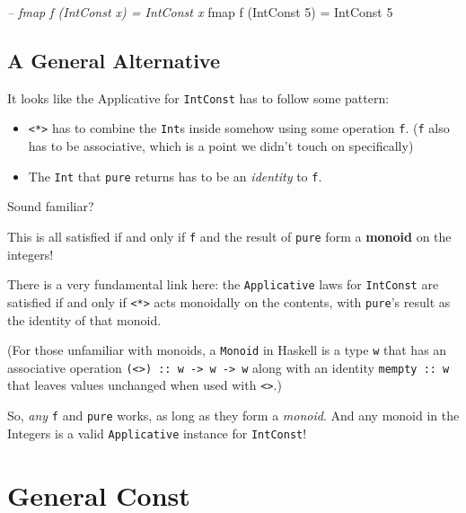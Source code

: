 \documentclass[]{article}
\newenvironment{Shaded}{}{}
\newcommand{\CommentTok}[1]{\textcolor[rgb]{0.38,0.63,0.69}{\textit{#1}}}
\newcommand{\DataTypeTok}[1]{\textcolor[rgb]{0.56,0.13,0.00}{#1}}
\newcommand{\DecValTok}[1]{\textcolor[rgb]{0.25,0.63,0.44}{#1}}
\newcommand{\FunctionTok}[1]{\textcolor[rgb]{0.02,0.16,0.49}{#1}}
\newcommand{\NormalTok}[1]{#1}
\begin{document}
\begin{Shaded}
\begin{Highlighting}[]
\CommentTok{-- fmap f (IntConst x) = IntConst x}
\NormalTok{fmap f (}\DataTypeTok{IntConst} \DecValTok{5}\NormalTok{) }\FunctionTok{=} \DataTypeTok{IntConst} \DecValTok{5}
\end{Highlighting}
\end{Shaded}

\hypertarget{a-general-alternative}{%
\subsection{A General Alternative}\label{a-general-alternative}}

It looks like the Applicative for \texttt{IntConst} has to follow some pattern:

\begin{itemize}
\tightlist
\item
  \texttt{\textless{}*\textgreater{}} has to combine the \texttt{Int}s inside
  somehow using some operation \texttt{f}. (\texttt{f} also has to be
  associative, which is a point we didn't touch on specifically)
\item
  The \texttt{Int} that \texttt{pure} returns has to be an \emph{identity} to
  \texttt{f}.
\end{itemize}

Sound familiar?

This is all satisfied if and only if \texttt{f} and the result of \texttt{pure}
form a \textbf{monoid} on the integers!

There is a very fundamental link here: the \texttt{Applicative} laws for
\texttt{IntConst} are satisfied if and only if
\texttt{\textless{}*\textgreater{}} acts monoidally on the contents, with
\texttt{pure}'s result as the identity of that monoid.

(For those unfamiliar with monoids, a \texttt{Monoid} in Haskell is a type
\texttt{w} that has an associative operation
\texttt{(\textless{}\textgreater{})\ ::\ w\ -\textgreater{}\ w\ -\textgreater{}\ w}
along with an identity \texttt{mempty\ ::\ w} that leaves values unchanged when
used with \texttt{\textless{}\textgreater{}}.)

So, \emph{any} \texttt{f} and \texttt{pure} works, as long as they form a
\emph{monoid}. And any monoid in the Integers is a valid \texttt{Applicative}
instance for \texttt{IntConst}!

\hypertarget{general-const}{%
\section{General Const}\label{general-const}}
\end{document}
